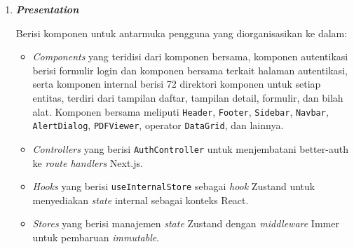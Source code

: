 \begin{enumerate}[listparindent=1cm]
\begin{enumerate}[listparindent=1cm, label=\alph*.]
                        \begin{itemize}
                              \item \textit{Data sources} berupa klien Axios untuk komunikasi API \textit{backend}, konfigurasi autentikasi server dan klien dengan better-auth, serta penyimpanan sesi dan lokal. Contoh kode program dapat dilihat pada 
                              \item \textit{Data Transfer Object} (DTO) dan \textit{mapper} sebanyak 37 berkas yang menyediakan konversi dua arah antara format \textit{snake\_case} API dan format \textit{camelCase} \textit{domain} menggunakan Luxon untuk penanganan tanggal. Contoh kode program dapat dilihat pada 
                              \item Implementasi repositori sebanyak 37 berkas yang menerima \texttt{InfinityApiDataSource} melalui injeksi dependensi dan melakukan pemanggilan REST API, memetakan kueri untuk penyaringan, pengurutan, dan paginasi berbasis kursor, serta membungkus kesalahan dengan \texttt{handleAxiosError()}. Setiap operasi repositori mengembalikan \texttt{Effect.Either<T, Error>} untuk penanganan kesalahan. Contoh kode program dapat dilihat pada 
                        \end{itemize}

                  \item \textbf{\textit{Presentation}}

                        Berisi komponen untuk antarmuka pengguna yang diorganisasikan ke dalam:

                        \begin{itemize}
                              \item \textit{Components} yang teridisi dari komponen bersama, komponen autentikasi berisi formulir login dan komponen bersama terkait halaman autentikasi, serta komponen internal berisi 72 direktori komponen untuk setiap entitas, terdiri dari tampilan daftar, tampilan detail, formulir, dan bilah alat. Komponen bersama meliputi \texttt{Header}, \texttt{Footer}, \texttt{Sidebar}, \texttt{Navbar}, \texttt{AlertDialog}, \texttt{PDFViewer}, operator \texttt{DataGrid}, dan lainnya.
                              \item \textit{Controllers} yang berisi \texttt{AuthController} untuk menjembatani better-auth ke \textit{route handlers} Next.js.
                              \item \textit{Hooks} yang berisi \texttt{useInternalStore} sebagai \textit{hook} Zustand untuk menyediakan \textit{state} internal sebagai konteks React.
                              \item \textit{Stores} yang berisi manajemen \textit{state} Zustand dengan \textit{middleware} Immer untuk pembaruan \textit{immutable}.
                        \end{itemize}
            \end{enumerate}


\end{enumerate}

